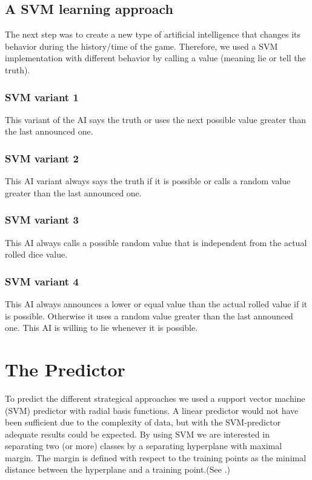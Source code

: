 \documentclass[11pt]{article}
\begin{document}
\subsection{A SVM learning approach}
The next step was to create a new type of artificial intelligence that changes its behavior during the history/time of the game.
Therefore, we used a SVM implementation with different behavior by calling a value (meaning lie or tell the truth).

\subsubsection{SVM variant 1}
\label{sssec:svm1}
This variant of the AI says the truth or uses the next possible value greater than the last announced one.

\subsubsection{SVM variant 2}
\label{sssec:svm2}
This AI variant always says the truth if it is possible or calls a random value greater than the last announced one. 

\subsubsection{SVM variant 3}
\label{sssec:svm3}
This AI always calls a possible random value that is independent from the actual rolled dice value.

\subsubsection{SVM variant 4}
\label{sssec:svm4}
This AI always announces a lower or equal value than the actual rolled value if it is possible. Otherwise it uses a random value greater than the last announced one. This AI is willing to lie whenever it is possible. 

\section{The Predictor}
To predict the different strategical approaches we used a support vector machine (SVM) predictor with radial basis functions. A linear predictor would not have been sufficient due to the complexity of data, but with the SVM-predictor adequate results could be expected.
By using SVM we are interested in separating two (or more) classes by a separating hyperplane with maximal margin. The margin is defined with respect to the training points as the minimal distance between the hyperplane and a training point.(See \cite[187--227]{Schoellkopf:02}.)
\end{document}
